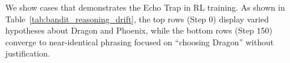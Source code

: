 We show cases that demonstrates the Echo Trap in RL training. As shown in Table~\ref{tab:bandit_reasoning_drift}, the top rows (Step 0) display varied hypotheses about Dragon and Phoenix, while the bottom rows (Step 150) converge to near-identical phrasing focused on “choosing Dragon” without justification.





